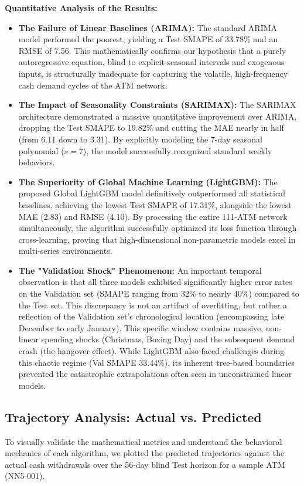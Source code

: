 \documentclass[conference, 12pt, onecolumn]{IEEEtran}
\begin{document}
\textbf{Quantitative Analysis of the Results:}
\begin{itemize}
    \item \textbf{The Failure of Linear Baselines (ARIMA):} The standard ARIMA model performed the poorest, yielding a Test SMAPE of 33.78\% and an RMSE of 7.56. This mathematically confirms our hypothesis that a purely autoregressive equation, blind to explicit seasonal intervals and exogenous inputs, is structurally inadequate for capturing the volatile, high-frequency cash demand cycles of the ATM network.
    \item \textbf{The Impact of Seasonality Constraints (SARIMAX):} The SARIMAX architecture demonstrated a massive quantitative improvement over ARIMA, dropping the Test SMAPE to 19.82\% and cutting the MAE nearly in half (from 6.11 down to 3.31). By explicitly modeling the 7-day seasonal polynomial ($s=7$), the model successfully recognized standard weekly behaviors. 
    \item \textbf{The Superiority of Global Machine Learning (LightGBM):} The proposed Global LightGBM model definitively outperformed all statistical baselines, achieving the lowest Test SMAPE of 17.31\%, alongside the lowest MAE (2.83) and RMSE (4.10). By processing the entire 111-ATM network simultaneously, the algorithm successfully optimized its loss function through cross-learning, proving that high-dimensional non-parametric models excel in multi-series environments.
    \item \textbf{The "Validation Shock" Phenomenon:} An important temporal observation is that all three models exhibited significantly higher error rates on the Validation set (SMAPE ranging from 32\% to nearly 40\%) compared to the Test set. This discrepancy is not an artifact of overfitting, but rather a reflection of the Validation set's chronological location (encompassing late December to early January). This specific window contains massive, non-linear spending shocks (Christmas, Boxing Day) and the subsequent demand crash (the hangover effect). While LightGBM also faced challenges during this chaotic regime (Val SMAPE 33.44\%), its inherent tree-based boundaries prevented the catastrophic extrapolations often seen in unconstrained linear models.
\end{itemize}

\subsection{Trajectory Analysis: Actual vs. Predicted}
To visually validate the mathematical metrics and understand the behavioral mechanics of each algorithm, we plotted the predicted trajectories against the actual cash withdrawals over the 56-day blind Test horizon for a sample ATM (NN5-001).
\end{document}
